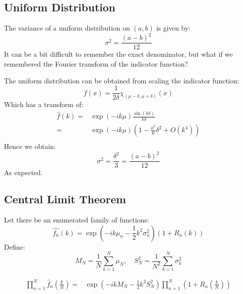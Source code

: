 \subsection{Uniform Distribution}
The variance of a uniform distribution on $(a,b)$ is given by:
\[\sigma^2 = \frac{(a-b)^2}{12}\]
It can be a bit difficult to remember the exact denominator, but what if we remembered the Fourier transform of the indicator function?

The uniform distribution can be obtained from scaling the indicator function:
\[f(x) = \frac{1}{2\delta}\chi_{(\mu-\delta,\mu+\delta)}(x)\]
Which has a transform of:
\begin{equation*}
\begin{aligned}
\hat{f}(k) =& \exp(-ik\mu)\frac{\sin(k\delta)}{k\delta}\\ 
=& \exp(-ik\mu)\left(1-\frac{k^2}{6}\delta^2+ O(k^4)\right)\\ 
\end{aligned}
\end{equation*}
Hence we obtain:
\[\sigma^2 =\frac{\delta^2}{3} = \frac{(a-b)^2}{12}\]
As expected.

\subsection{Central Limit Theorem}
Let there be an enumerated family of functions:
\[\hat{f_n}(k) = \exp\left(-ik\mu_n-\frac{1}{2}k^2\sigma^2_n\right)(1+R_n(k))\]
Define:
\[M_N = \frac{1}{N}\sum_{k=1}^{N}\mu_N,\quad S_N^2 = \frac{1}{N^2}\sum_{k=1}^{N}\sigma^2_k\]

\begin{equation*}
\begin{aligned}
\prod_{n=1}^N\hat{f}_n\left(\frac{k}{N}\right) =&\exp\left(-ikM_N-\frac{1}{2}k^2S^2_N\right)\prod_{n=1}^{N}\left(1+R_n\left(\frac{k}{N}\right)\right) \\
\end{aligned}
\end{equation*}

